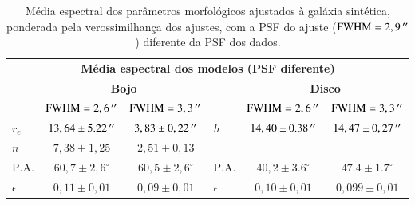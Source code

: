 \begin{table}
\begin{tabular}{ l c c  l c c }
  \hline
  \multicolumn{6}{c}{\textbf{Média espectral dos modelos (PSF diferente)}} \\
  & \multicolumn{2}{c}{\textbf{Bojo}} & & \multicolumn{2}{c}{\textbf{Disco}} \\
  & $\mathrm{FWHM} = 2,6\,^{\prime\prime}$ & $\mathrm{FWHM} = 3,3\,^{\prime\prime}$ & &
  $\mathrm{FWHM} = 2,6\,^{\prime\prime}$ & $\mathrm{FWHM} = 3,3\,^{\prime\prime}$ \\
  \hline
  $r_e$ & $13,64 \pm 5.22\,^{\prime\prime}$ & $3,83 \pm 0,22\,^{\prime\prime}$ & $h$ & $14,40
  \pm 0.38\,^{\prime\prime}$ & $14,47 \pm 0,27\,^{\prime\prime}$ \\
  $n$ & $7,38 \pm 1,25$ & $2,51 \pm 0,13$ & & & \\
  $\mathrm{P.A.}$ & $60,7 \pm 2,6^\circ$ & $60,5 \pm
  2,6^\circ$ & $\mathrm{P.A.}$ & $40,2 \pm 3.6^\circ$ & $47.4 \pm
  1.7^\circ$ \\
  $\epsilon$ & $0,11 \pm 0,01$ & $0,09 \pm 0,01$ & $\epsilon$ & $0,10 \pm
  0,01$ & $0,099 \pm 0,01$ \\
  \hline
\end{tabular}
\caption[Parâmetros do ajuste morfológico espectral com PSF diferente]
{Média espectral dos parâmetros morfológicos ajustados à galáxia sintética,
ponderada pela verossimilhança dos ajustes, com a PSF do ajuste ($\mathrm{FWHM}
= 2,9\,^{\prime\prime}$) diferente da PSF dos dados.}
\label{tab:testeAjustePSF}
\end{table}

